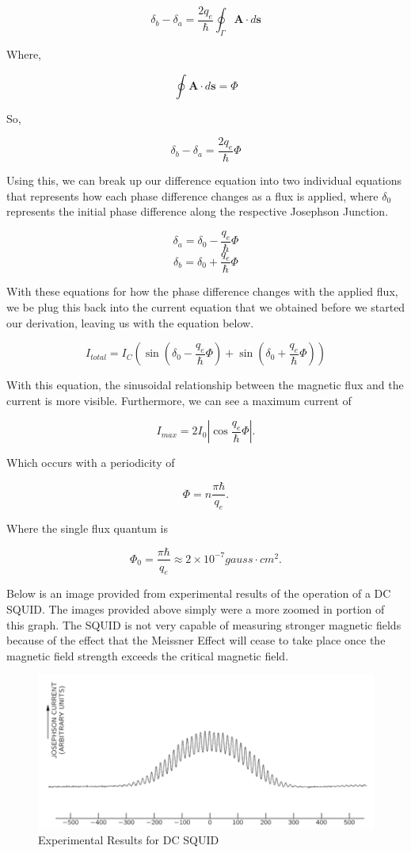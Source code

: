 \documentclass[conf]{new-aiaa}
\begin{document}
$$\delta_{b} - \delta_{a} = \frac{2q_{e}}{\hbar} \oint_{\Gamma} \boldsymbol A \cdot d\boldsymbol s$$

Where, 

$$\oint \boldsymbol A \cdot d\boldsymbol s = \Phi $$

So,

$$\delta_{b} - \delta_{a} = \frac{2q_{e}}{\hbar} \Phi $$

Using this, we can break up our difference equation into two individual equations that represents how each phase difference changes as a flux is applied, where \(\delta_{0}\) represents the initial phase difference along the respective Josephson Junction.

$$\delta_{a} = \delta_{0} - \frac{q_{e}}{\hbar}\Phi$$
$$\delta_{b} = \delta_{0} + \frac{q_{e}}{\hbar}\Phi$$

With these equations for how the phase difference changes with the applied flux, we be plug this back into the current equation that we obtained before we started our derivation, leaving us with the equation below.

$$I_{total} = I_{C}(\sin{(\delta_{0} - \frac{q_{e}}{\hbar}\Phi)} + \sin{(\delta_{0} + \frac{q_{e}}{\hbar}\Phi)})$$

With this equation, the sinusoidal relationship between the magnetic flux and the current is more visible. Furthermore, we can see a maximum current of 

$$I_{max} = 2I_{0}|\cos{\frac{q_e}{\hbar}\Phi}|.$$

Which occurs with a periodicity of  

$$\Phi = n \frac{\pi\hbar}{q_{e}}.$$

Where the single flux quantum is

$$\Phi_{0} = \frac{\pi\hbar}{q_{e}} \approx 2 \times 10^{-7} gauss \cdot cm^{2} .$$

Below is an image provided from experimental results of the operation of a DC SQUID. The images provided above simply were a more zoomed in portion of this graph. The SQUID is not very capable of measuring stronger magnetic fields because of the effect that the Meissner Effect will cease to take place once the magnetic field strength exceeds the critical magnetic field.

\begin{figure}[!h]
    \centering
    \includegraphics[width = .6\linewidth]{Result.png}
    \caption{Experimental Results for DC SQUID}
\end{figure}
\end{document}
